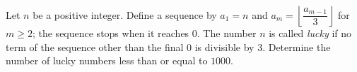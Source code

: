 Let $n$ be a positive integer. Define a sequence by $a_1=n$ and $a_m=\left\lfloor\dfrac{a_{m-1}}{3}\right\rfloor$ for $m\ge2$; the sequence stops when it reaches $0$. The number $n$ is called \emph{lucky} if no term of the sequence other than the final $0$ is divisible by $3$. Determine the number of lucky numbers less than or equal to $1000$.
